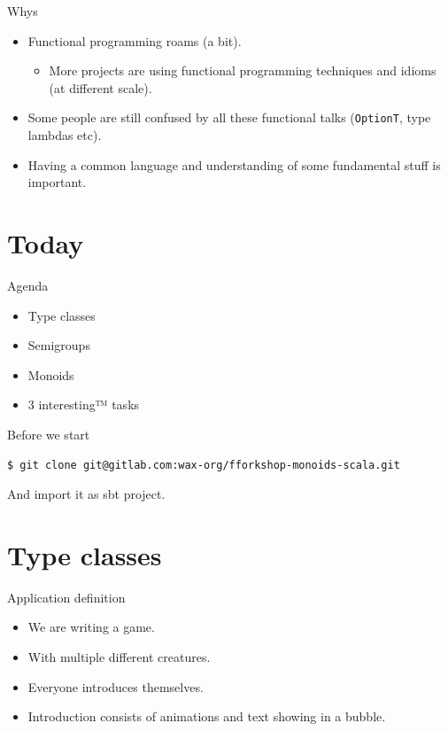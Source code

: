 \documentclass[presentation,aspectratio=169,smaller]{beamer}
\begin{document}
\begin{frame}[label={sec:org89310db},fragile]{Whys}
 \begin{itemize}
\item <1-> Functional programming roams (a bit).
\begin{itemize}
\item More projects are using functional programming techniques and idioms (at
different scale).
\end{itemize}
\item <2-> Some people are still confused by all these functional talks (\texttt{OptionT}, type
lambdas etc).
\item <3-> Having a common language and understanding of some fundamental stuff is
important.
\end{itemize}
\end{frame}

\section*{Today}
\label{sec:orga81ea1e}
\begin{frame}[label={sec:org1bce288}]{Agenda}
\begin{itemize}
\item Type classes
\item Semigroups
\item Monoids
\item 3 interesting™ tasks
\end{itemize}
\end{frame}

\begin{frame}[label={sec:org45acb4e},fragile]{Before we start}
 \begin{verbatim}
$ git clone git@gitlab.com:wax-org/fforkshop-monoids-scala.git
\end{verbatim}

And import it as sbt project.
\end{frame}

\section{Type classes}
\label{sec:org8a863c7}

\begin{frame}[label={sec:orgd3f1218}]{Application definition}
\begin{itemize}
\item We are writing a game.
\item With multiple different creatures.
\item Everyone introduces themselves.
\item Introduction consists of animations and text showing in a bubble.
\end{itemize}
\end{frame}
\end{document}
